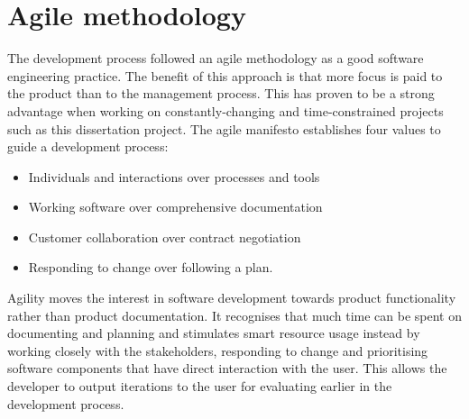 \section{Agile methodology}
The development process followed an agile methodology as a good software engineering practice. The benefit of this approach is that more focus is paid to the product than to the management process. This has proven to be a strong advantage when working on constantly-changing and time-constrained projects such as this dissertation project.
The agile manifesto \cite{Martin2002} establishes four values to guide a development process: 
\begin{displayquote}
\begin{itemize}
  \item Individuals and interactions over processes and tools
  \item Working software over comprehensive documentation
  \item Customer collaboration over contract negotiation
  \item Responding to change over following a plan. 
\end{itemize}
\end{displayquote}

Agility moves the interest in software development towards product functionality rather than product documentation. It recognises that much time can be spent on documenting and planning and stimulates smart resource usage instead by working closely with the stakeholders, responding to change and prioritising software components that have direct interaction with the user. This allows the developer to output iterations to the user for evaluating earlier in the development process.

\iffalse
\subsection{Self-management}
Versioning software was used to manage the workflow of the different components of the system, the repositories are available online in a public GitHub repository. Links
\fi